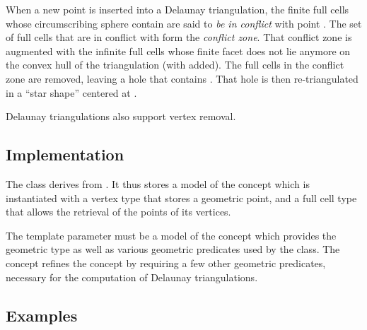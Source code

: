 
When a new point  is inserted into a Delaunay triangulation, the
finite full cells whose circumscribing sphere contain  are said to
{\em be in conflict} with point . The set of full cells that are in
conflict with  form the {\em conflict zone}. That conflict zone is
augmented with the infinite full cells whose finite facet does not lie
anymore on the convex hull of the triangulation (with  added). The full cells
in the conflict zone are removed, leaving a hole that contains . That
hole is then re-triangulated in a ``star shape'' centered at .

Delaunay triangulations also support vertex removal.


\subsection{Implementation}

The class  derives from
. It thus stores a model \tds of
the concept  which is instantiated with a vertex
type that stores a geometric point, and a full cell type that allows the
retrieval of the points of its vertices.

The template parameter  must be a model of the concept
 which provides the geometric  type as
well as various geometric predicates used by the  class.
The concept  refines the concept
 by requiring a few other geometric predicates, necessary
for the computation of Delaunay triangulations.


\subsection{Examples}

